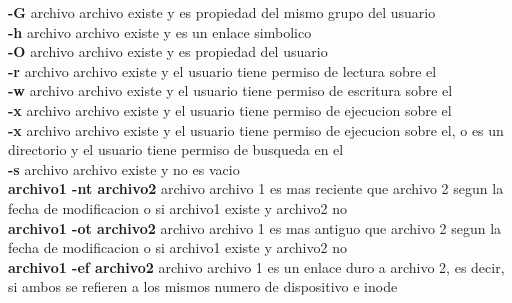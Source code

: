 \documentclass[11pt]{article}
\begin{document}
\hspace{2cm} \textbf{-G} archivo \hspace{2cm} archivo existe y es propiedad del mismo grupo del usuario \\

\hspace{2cm} \textbf{-h} archivo \hspace{2cm} archivo existe y es un enlace simbolico \\

\hspace{2cm} \textbf{-O} archivo \hspace{2cm} archivo existe y es propiedad del usuario \\

\hspace{2cm} \textbf{-r} archivo \hspace{2cm} archivo existe y el usuario tiene permiso de lectura sobre el\\

\hspace{2cm} \textbf{-w} archivo \hspace{2cm} archivo existe y el usuario tiene permiso de escritura sobre el\\

\hspace{2cm} \textbf{-x} archivo \hspace{2cm} archivo existe y el usuario tiene permiso de ejecucion sobre el \\

\hspace{2cm} \textbf{-x} archivo \hspace{2cm} archivo existe y el usuario tiene permiso de ejecucion sobre el, o es un directorio y el usuario tiene permiso de busqueda en el \\

\hspace{2cm} \textbf{-s} archivo \hspace{2cm} archivo existe y no es vacio \\

\hspace{2cm} \textbf{archivo1 -nt archivo2} archivo \hspace{2cm} archivo 1 es mas reciente que archivo 2 segun la fecha de modificacion o si archivo1 existe y archivo2 no\\

\hspace{2cm} \textbf{archivo1 -ot archivo2} archivo \hspace{2cm} archivo 1 es mas antiguo que archivo 2 segun la fecha de modificacion o si archivo1 existe y archivo2 no\\


\hspace{2cm} \textbf{archivo1 -ef archivo2} archivo \hspace{2cm} archivo 1 es un enlace duro a archivo 2, es decir, si ambos se refieren a los mismos numero de dispositivo e inode\\




 



\hspace{2cm} 

\hspace{2cm}
\end{document}
